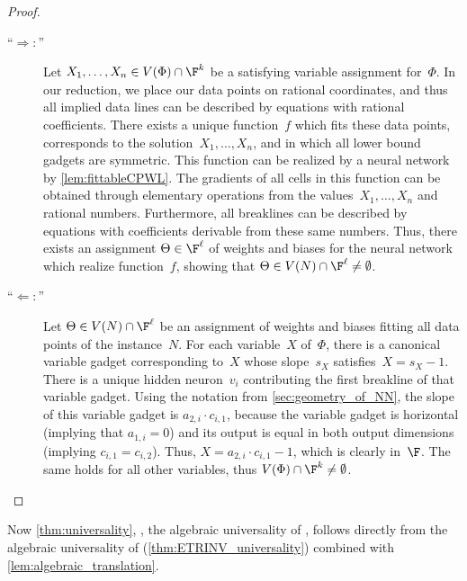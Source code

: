 \documentclass{toc}
\begin{document}
\begin{proof}
    \begin{description}
        \item[\enquote{$\Longrightarrow:$}]
        Let $X_1, \ldots, X_n \in V(\Phi) \cap \F^k$ be a satisfying variable assignment for~$\Phi$.
        In our reduction, we place our data points on rational coordinates, and thus all implied data lines can be described by equations with rational coefficients.
        There exists a unique \CPWL function~$f$ which fits these data points, corresponds to the solution~$X_1, \ldots, X_n$, and in which all lower bound gadgets are symmetric.
        This function can be realized by a \fullyconnected \twolayer neural network by \cref{lem:fittableCPWL}.
        The gradients of all cells in this function can be obtained through elementary operations from the values~$X_1, \ldots, X_n$ and rational numbers.
        Furthermore, all breaklines can be described by equations with coefficients derivable from these same numbers.
        Thus, there %
exists an assignment $\Theta \in \F^\ell$ of weights and biases %
for the neural network which realize function~$f$, showing that $\Theta \in V(N) \cap \F^\ell \neq \emptyset$.
        
        \item[\enquote{$\Longleftarrow:$}]
         Let $\Theta \in V(N) \cap \F^\ell$ be %
an assignment %
of weights and biases fitting all data points of the \trainNN instance~$N$.
        For each variable~$X$ of~$\Phi$, there is a canonical variable gadget corresponding to~$X$ whose slope~$s_X$ satisfies~$X = s_X - 1$.
        There is a unique hidden neuron~$v_i$ contributing the first breakline of that variable gadget.
        Using the notation from \cref{sec:geometry_of_NN}, the slope of this variable gadget is $a_{2,i} \cdot c_{i,1}$, because the variable gadget is horizontal (implying that $a_{1,i} = 0$) and its output is equal in both output dimensions (implying $c_{i,1} = c_{i,2}$).
        Thus, $X = a_{2,i} \cdot c_{i,1} - 1$, which is clearly in~$\F$.
        The same holds for all other variables, thus $V(\Phi) \cap \F^k \neq \emptyset$.
        \qedhere
    \end{description}
\end{proof}

Now \cref{thm:universality}, \ie,  the algebraic universality of \trainNN, follows directly from the algebraic universality of \ETRINV (\cref{thm:ETRINV_universality}) combined with \cref{lem:algebraic_translation}.
\end{document}
